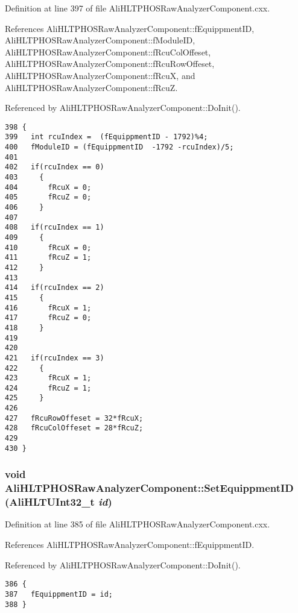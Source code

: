 Definition at line 397 of file Ali\-HLTPHOSRaw\-Analyzer\-Component.cxx.

References Ali\-HLTPHOSRaw\-Analyzer\-Component::f\-Equippment\-ID, Ali\-HLTPHOSRaw\-Analyzer\-Component::f\-Module\-ID, Ali\-HLTPHOSRaw\-Analyzer\-Component::f\-Rcu\-Col\-Offeset, Ali\-HLTPHOSRaw\-Analyzer\-Component::f\-Rcu\-Row\-Offeset, Ali\-HLTPHOSRaw\-Analyzer\-Component::f\-Rcu\-X, and Ali\-HLTPHOSRaw\-Analyzer\-Component::f\-Rcu\-Z.

Referenced by Ali\-HLTPHOSRaw\-Analyzer\-Component::Do\-Init().

\footnotesize\begin{verbatim}398 {
399   int rcuIndex =  (fEquippmentID - 1792)%4;
400   fModuleID = (fEquippmentID  -1792 -rcuIndex)/5;
401 
402   if(rcuIndex == 0)
403     {
404       fRcuX = 0; 
405       fRcuZ = 0;
406     }
407 
408   if(rcuIndex == 1)
409     {
410       fRcuX = 0; 
411       fRcuZ = 1;
412     }
413  
414   if(rcuIndex == 2)
415     {
416       fRcuX = 1; 
417       fRcuZ = 0;
418     }
419 
420 
421   if(rcuIndex == 3)
422     {
423       fRcuX = 1; 
424       fRcuZ = 1;
425     }
426 
427   fRcuRowOffeset = 32*fRcuX;
428   fRcuColOffeset = 28*fRcuZ;
429 
430 }
\end{verbatim}\normalsize 


\subsubsection{\setlength{\rightskip}{0pt plus 5cm}void Ali\-HLTPHOSRaw\-Analyzer\-Component::Set\-Equippment\-ID (Ali\-HLTUInt32\_\-t {\em id})\hspace{0.3cm}{\tt  [inherited]}}\label{classAliHLTPHOSRawAnalyzerComponent_AliHLTPHOSRawAnalyzerPeakFinderComponenta10}




Definition at line 385 of file Ali\-HLTPHOSRaw\-Analyzer\-Component.cxx.

References Ali\-HLTPHOSRaw\-Analyzer\-Component::f\-Equippment\-ID.

Referenced by Ali\-HLTPHOSRaw\-Analyzer\-Component::Do\-Init().

\footnotesize\begin{verbatim}386 {
387   fEquippmentID = id;
388 }
\end{verbatim}\normalsize 


